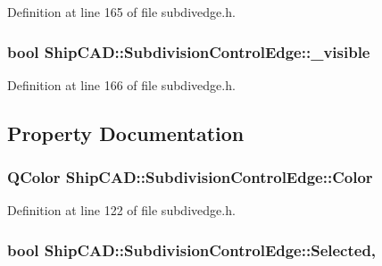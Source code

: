 Definition at line 165 of file subdivedge.\-h.

\hypertarget{classShipCAD_1_1SubdivisionControlEdge_a8d49343e2b6ff0ab13653849af242740}{
\subsubsection[{\-\_\-visible}]{\setlength{\rightskip}{0pt plus 5cm}bool Ship\-C\-A\-D\-::\-Subdivision\-Control\-Edge\-::\-\_\-visible\hspace{0.3cm}{\ttfamily [protected]}}}\label{classShipCAD_1_1SubdivisionControlEdge_a8d49343e2b6ff0ab13653849af242740}


Definition at line 166 of file subdivedge.\-h.



\subsection{Property Documentation}
\hypertarget{classShipCAD_1_1SubdivisionControlEdge_a1aaeec9c0e1dc9d7b49dfe2913e8a0a7}{
\subsubsection[{Color}]{\setlength{\rightskip}{0pt plus 5cm}Q\-Color Ship\-C\-A\-D\-::\-Subdivision\-Control\-Edge\-::\-Color\hspace{0.3cm}{\ttfamily [read]}}}\label{classShipCAD_1_1SubdivisionControlEdge_a1aaeec9c0e1dc9d7b49dfe2913e8a0a7}


Definition at line 122 of file subdivedge.\-h.

\hypertarget{classShipCAD_1_1SubdivisionControlEdge_a25279492599975df97efcaa124e09855}{
\subsubsection[{Selected}]{\setlength{\rightskip}{0pt plus 5cm}bool Ship\-C\-A\-D\-::\-Subdivision\-Control\-Edge\-::\-Selected\hspace{0.3cm}{\ttfamily [read]}, {\ttfamily [write]}}}\label{classShipCAD_1_1SubdivisionControlEdge_a25279492599975df97efcaa124e09855}


